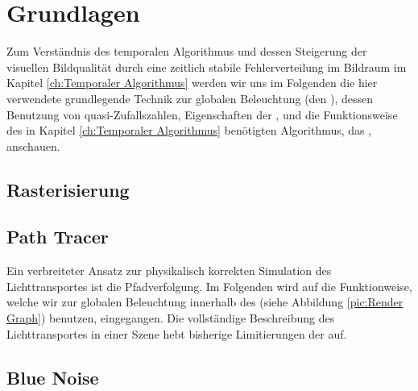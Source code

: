 \vfill
\chapter{Grundlagen}
\label{ch:Grundlagen}
Zum Verständnis des temporalen Algorithmus und dessen Steigerung der visuellen Bildqualität durch eine zeitlich stabile  Fehlerverteilung
im Bildraum im Kapitel \ref{ch:Temporaler Algorithmus} werden wir uns im Folgenden die hier verwendete grundlegende Technik zur globalen
Beleuchtung (den ), dessen Benutzung von quasi-Zufallszahlen, Eigenschaften der , 
und die Funktionsweise des in Kapitel \ref{ch:Temporaler Algorithmus} benötigten Algorithmus, das , anschauen.

\section{Rasterisierung}
\label{ch:Content1:sec:Rasterisierung}


\newpage
\section{Path Tracer}
\label{ch:Content1:sec:Path Tracer}
Ein verbreiteter Ansatz zur physikalisch korrekten Simulation des Lichttransportes ist die Pfadverfolgung. Im Folgenden wird auf die Funktionweise, welche wir 
zur globalen Beleuchtung innerhalb des (siehe Abbildung \ref{pic:Render Graph}) benutzen, eingegangen. Die vollständige 
Beschreibung des Lichttransportes in einer Szene hebt bisherige Limitierungen der  auf. 
\par



\newpage
\section{Blue Noise}
\label{ch:Content1:sec:blue noise}



